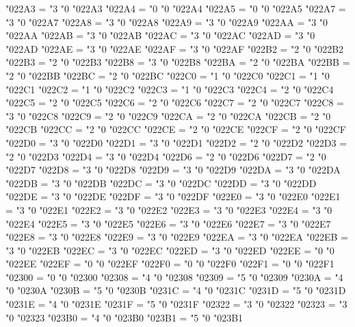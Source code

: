 \Umathcode "022A3 = "3 "0 "022A3
\Umathcode "022A4 = "0 "0 "022A4
\Umathcode "022A5 = "0 "0 "022A5
\Umathcode "022A7 = "3 "0 "022A7
\Umathcode "022A8 = "3 "0 "022A8
\Umathcode "022A9 = "3 "0 "022A9
\Umathcode "022AA = "3 "0 "022AA
\Umathcode "022AB = "3 "0 "022AB
\Umathcode "022AC = "3 "0 "022AC
\Umathcode "022AD = "3 "0 "022AD
\Umathcode "022AE = "3 "0 "022AE
\Umathcode "022AF = "3 "0 "022AF
\Umathcode "022B2 = "2 "0 "022B2
\Umathcode "022B3 = "2 "0 "022B3
\Umathcode "022B8 = "3 "0 "022B8
\Umathcode "022BA = "2 "0 "022BA
\Umathcode "022BB = "2 "0 "022BB
\Umathcode "022BC = "2 "0 "022BC
\Umathcode "022C0 = "1 "0 "022C0
\Umathcode "022C1 = "1 "0 "022C1
\Umathcode "022C2 = "1 "0 "022C2
\Umathcode "022C3 = "1 "0 "022C3
\Umathcode "022C4 = "2 "0 "022C4
\Umathcode "022C5 = "2 "0 "022C5
\Umathcode "022C6 = "2 "0 "022C6
\Umathcode "022C7 = "2 "0 "022C7
\Umathcode "022C8 = "3 "0 "022C8
\Umathcode "022C9 = "2 "0 "022C9
\Umathcode "022CA = "2 "0 "022CA
\Umathcode "022CB = "2 "0 "022CB
\Umathcode "022CC = "2 "0 "022CC
\Umathcode "022CE = "2 "0 "022CE
\Umathcode "022CF = "2 "0 "022CF
\Umathcode "022D0 = "3 "0 "022D0
\Umathcode "022D1 = "3 "0 "022D1
\Umathcode "022D2 = "2 "0 "022D2
\Umathcode "022D3 = "2 "0 "022D3
\Umathcode "022D4 = "3 "0 "022D4
\Umathcode "022D6 = "2 "0 "022D6
\Umathcode "022D7 = "2 "0 "022D7
\Umathcode "022D8 = "3 "0 "022D8
\Umathcode "022D9 = "3 "0 "022D9
\Umathcode "022DA = "3 "0 "022DA
\Umathcode "022DB = "3 "0 "022DB
\Umathcode "022DC = "3 "0 "022DC
\Umathcode "022DD = "3 "0 "022DD
\Umathcode "022DE = "3 "0 "022DE
\Umathcode "022DF = "3 "0 "022DF
\Umathcode "022E0 = "3 "0 "022E0
\Umathcode "022E1 = "3 "0 "022E1
\Umathcode "022E2 = "3 "0 "022E2
\Umathcode "022E3 = "3 "0 "022E3
\Umathcode "022E4 = "3 "0 "022E4
\Umathcode "022E5 = "3 "0 "022E5
\Umathcode "022E6 = "3 "0 "022E6
\Umathcode "022E7 = "3 "0 "022E7
\Umathcode "022E8 = "3 "0 "022E8
\Umathcode "022E9 = "3 "0 "022E9
\Umathcode "022EA = "3 "0 "022EA
\Umathcode "022EB = "3 "0 "022EB
\Umathcode "022EC = "3 "0 "022EC
\Umathcode "022ED = "3 "0 "022ED
\Umathcode "022EE = "0 "0 "022EE
\Umathcode "022EF = "0 "0 "022EF
\Umathcode "022F0 = "0 "0 "022F0
\Umathcode "022F1 = "0 "0 "022F1
\Umathcode "02300 = "0 "0 "02300
\Umathcode "02308 = "4 "0 "02308
\Umathcode "02309 = "5 "0 "02309
\Umathcode "0230A = "4 "0 "0230A
\Umathcode "0230B = "5 "0 "0230B
\Umathcode "0231C = "4 "0 "0231C
\Umathcode "0231D = "5 "0 "0231D
\Umathcode "0231E = "4 "0 "0231E
\Umathcode "0231F = "5 "0 "0231F
\Umathcode "02322 = "3 "0 "02322
\Umathcode "02323 = "3 "0 "02323
\Umathcode "023B0 = "4 "0 "023B0
\Umathcode "023B1 = "5 "0 "023B1

